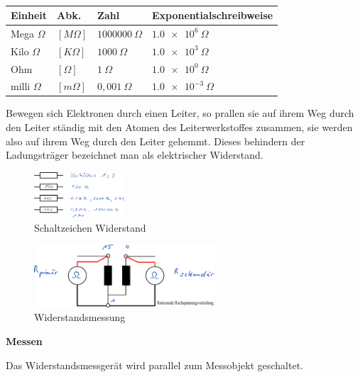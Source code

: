 \begin{table}[!ht]%
\centering 
	\caption{}%
\begin{tabular}{@{}llll@{}}
\hline
\textbf{Einheit} & \textbf{Abk.} & \textbf{Zahl} &
\textbf{Exponentialschreibweise} \\
\hline
Mega $\Omega$ & $[M\Omega]$ & $1000000~\Omega$ &
$\num{1,0e6}~\Omega$ \\
Kilo $\Omega$ & $[K\Omega]$ & $1000~\Omega$ &
$\num{1,0e3}~\Omega$ \\
Ohm & $[\Omega]$ & $1~\Omega$ & $\num{1,0e0}~\Omega$ \\
milli $\Omega$ & $[m\Omega]$ & $0,001~\Omega$ &
$\num{1,0e-3}~\Omega$ \\
\hline
\end{tabular} 
\end{table}

Bewegen sich Elektronen durch einen Leiter, so prallen sie auf ihrem Weg
durch den Leiter ständig mit den Atomen des Leiterwerkstoffes zusammen,
sie werden also auf ihrem Weg durch den Leiter gehemmt. Dieses behindern
der Ladungsträger bezeichnet man als elektrischer Widerstand.

\begin{figure}[!ht]%
\centering
\includegraphics[width=0.3\textwidth]{images/Skizze/15_Schaltzeichen_Widerstand_Skizze.pdf}
\caption{Schaltzeichen Widerstand}
\end{figure}

\begin{figure}[!ht]%
\centering
\includegraphics[width=0.6\textwidth]{images/Skizze/16_Widerstandsmessung_Skizze.pdf}
\caption{Widerstandsmessung}
\end{figure}

\textbf{Messen}

Das Widerstandsmessgerät wird parallel zum Messobjekt geschaltet.

